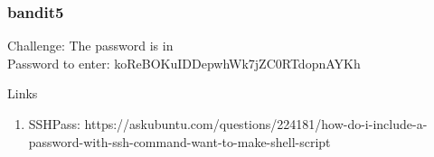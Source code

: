 \documentclass[a4paper]{article}
\begin{document}
\subsubsection{bandit5}
Challenge: The password is in \\
Password to enter: koReBOKuIDDepwhWk7jZC0RTdopnAYKh

Links
\begin{enumerate}
\item SSHPass: https://askubuntu.com/questions/224181/how-do-i-include-a-password-with-ssh-command-want-to-make-shell-script
\end{enumerate}
\end{document}
